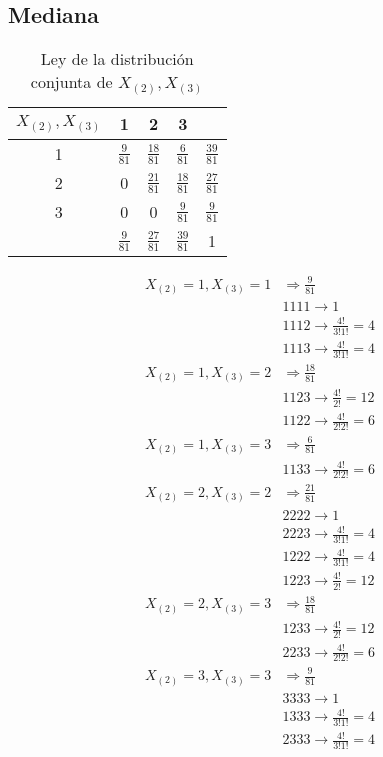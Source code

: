 \documentclass{article}
\begin{document}
    \subsection{Mediana}


      \begin{table}[H]
        \centering
        \begin{tabular}{c | c  c  c | c}
          $X_{(2)},X_{(3)}$ & 1               & 2               & 3               &                 \\ \hline
          1                 & $\frac{9}{81}$  & $\frac{18}{81}$ & $\frac{6}{81}$  &$\frac{39}{81}$  \\
          2                 & 0               & $\frac{21}{81}$ & $\frac{18}{81}$ & $\frac{27}{81}$ \\
          3                 & 0               & 0               & $\frac{9}{81}$  & $\frac{9}{81}$  \\ \hline
                            & $\frac{9}{81}$  & $\frac{27}{81}$ & $\frac{39}{81}$ & 1
        \end{tabular}
        \caption{Ley de la distribución conjunta de $X_{(2)},X_{(3)}$}
        \label{}
      \end{table}

      \begin{align*}
        X_{(2)} = 1,X_{(3)} = 1 & \Rightarrow \frac{9}{81}\\
        &1111 \rightarrow 1 \\
        &1112 \rightarrow \frac{4!}{3!1!} = 4 \\
        &1113 \rightarrow \frac{4!}{3!1!} = 4 \\
        X_{(2)} = 1,X_{(3)} = 2 & \Rightarrow \frac{18}{81}\\
        &1123 \rightarrow \frac{4!}{2!} = 12 \\
        &1122 \rightarrow \frac{4!}{2!2!} = 6  \\
        X_{(2)} = 1,X_{(3)} = 3 & \Rightarrow \frac{6}{81}\\
        &1133 \rightarrow \frac{4!}{2!2!} = 6  \\
        X_{(2)} = 2,X_{(3)} = 2 & \Rightarrow \frac{21}{81}\\
        &2222 \rightarrow 1 \\
        &2223 \rightarrow \frac{4!}{3!1!} = 4 \\
        &1222 \rightarrow \frac{4!}{3!1!} = 4 \\
        &1223 \rightarrow \frac{4!}{2!} = 12 \\
        X_{(2)} = 2,X_{(3)} = 3 & \Rightarrow \frac{18}{81}\\
        &1233 \rightarrow \frac{4!}{2!} = 12 \\
        &2233 \rightarrow \frac{4!}{2!2!} = 6  \\
        X_{(2)} = 3,X_{(3)} = 3 & \Rightarrow \frac{9}{81}\\
        &3333 \rightarrow 1 \\
        &1333 \rightarrow \frac{4!}{3!1!} = 4 \\
        &2333 \rightarrow \frac{4!}{3!1!} = 4 \\
      \end{align*}
\end{document}
